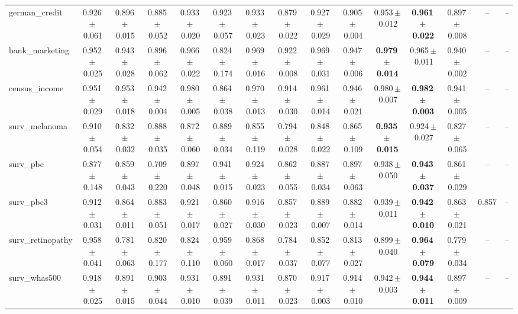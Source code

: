 \documentclass[8pt]{extarticle}
\begin{document}
\begin{longtable}{l*{14}{c}}
german\_credit & 0.926\,$\pm$\,0.061 & 0.896\,$\pm$\,0.015 & 0.885\,$\pm$\,0.052 & 0.933\,$\pm$\,0.020 & 0.923\,$\pm$\,0.057 & 0.933\,$\pm$\,0.023 & 0.879\,$\pm$\,0.022 & 0.927\,$\pm$\,0.029 & 0.905\,$\pm$\,0.004 & 0.953\,$\pm$\,0.012 & \textbf{0.961\,$\pm$\,0.022} & 0.897\,$\pm$\,0.008 & -- & -- \\
bank\_marketing & 0.952\,$\pm$\,0.025 & 0.943\,$\pm$\,0.028 & 0.896\,$\pm$\,0.062 & 0.966\,$\pm$\,0.022 & 0.824\,$\pm$\,0.174 & 0.969\,$\pm$\,0.016 & 0.922\,$\pm$\,0.008 & 0.969\,$\pm$\,0.031 & 0.947\,$\pm$\,0.006 & \textbf{0.979\,$\pm$\,0.014} & 0.965\,$\pm$\,0.011 & 0.940\,$\pm$\,0.002 & -- & -- \\
census\_income & 0.951\,$\pm$\,0.029 & 0.953\,$\pm$\,0.018 & 0.942\,$\pm$\,0.004 & 0.980\,$\pm$\,0.005 & 0.864\,$\pm$\,0.038 & 0.970\,$\pm$\,0.013 & 0.914\,$\pm$\,0.030 & 0.961\,$\pm$\,0.014 & 0.946\,$\pm$\,0.021 & 0.980\,$\pm$\,0.007 & \textbf{0.982\,$\pm$\,0.003} & 0.941\,$\pm$\,0.005 & -- & -- \\
surv\_melanoma & 0.910\,$\pm$\,0.054 & 0.832\,$\pm$\,0.032 & 0.888\,$\pm$\,0.035 & 0.872\,$\pm$\,0.060 & 0.889\,$\pm$\,0.034 & 0.855\,$\pm$\,0.119 & 0.794\,$\pm$\,0.028 & 0.848\,$\pm$\,0.022 & 0.865\,$\pm$\,0.109 & \textbf{0.935\,$\pm$\,0.015} & 0.924\,$\pm$\,0.027 & 0.827\,$\pm$\,0.065 & -- & -- \\
surv\_pbc & 0.877\,$\pm$\,0.148 & 0.859\,$\pm$\,0.043 & 0.709\,$\pm$\,0.220 & 0.897\,$\pm$\,0.048 & 0.941\,$\pm$\,0.015 & 0.924\,$\pm$\,0.023 & 0.862\,$\pm$\,0.055 & 0.887\,$\pm$\,0.034 & 0.897\,$\pm$\,0.063 & 0.938\,$\pm$\,0.050 & \textbf{0.943\,$\pm$\,0.037} & 0.861\,$\pm$\,0.029 & -- & -- \\
surv\_pbc3 & 0.912\,$\pm$\,0.031 & 0.864\,$\pm$\,0.011 & 0.883\,$\pm$\,0.051 & 0.921\,$\pm$\,0.017 & 0.860\,$\pm$\,0.027 & 0.916\,$\pm$\,0.030 & 0.857\,$\pm$\,0.023 & 0.889\,$\pm$\,0.007 & 0.882\,$\pm$\,0.014 & 0.939\,$\pm$\,0.011 & \textbf{0.942\,$\pm$\,0.010} & 0.863\,$\pm$\,0.021 & 0.857 & -- \\
surv\_retinopathy & 0.958\,$\pm$\,0.041 & 0.781\,$\pm$\,0.063 & 0.820\,$\pm$\,0.177 & 0.824\,$\pm$\,0.110 & 0.959\,$\pm$\,0.060 & 0.868\,$\pm$\,0.017 & 0.784\,$\pm$\,0.037 & 0.852\,$\pm$\,0.077 & 0.813\,$\pm$\,0.027 & 0.899\,$\pm$\,0.040 & \textbf{0.964\,$\pm$\,0.079} & 0.779\,$\pm$\,0.034 & -- & -- \\
surv\_whas500 & 0.918\,$\pm$\,0.025 & 0.891\,$\pm$\,0.015 & 0.903\,$\pm$\,0.044 & 0.931\,$\pm$\,0.010 & 0.891\,$\pm$\,0.039 & 0.931\,$\pm$\,0.011 & 0.870\,$\pm$\,0.023 & 0.917\,$\pm$\,0.003 & 0.914\,$\pm$\,0.010 & 0.942\,$\pm$\,0.003 & \textbf{0.944\,$\pm$\,0.011} & 0.897\,$\pm$\,0.009 & -- & -- \\

\end{longtable}
\end{document}
